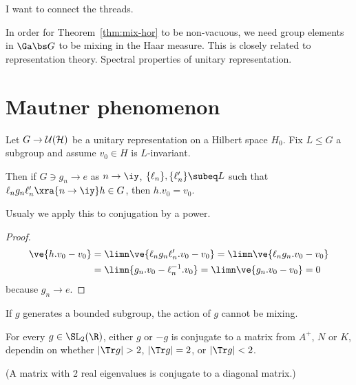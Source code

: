I want to connect the threads. %


In order for Theorem~\ref{thm:mix-hor} to be non-vacuous, we need group elements in $\Ga\bs G$ to be mixing in the Haar measure. This is closely related to representation theory. Spectral properties of unitary representation. 

\section{Mautner phenomenon}

\begin{lem}
Let $G\to \cal U(H)$ be a unitary representation on a Hilbert space $H_0$. Fix $L\le G$ a subgroup and assume $v_0\in H$ is $L$-invariant. 

Then if $G\ni g_n\to e$ as $n\to \iy$, $\{\ell_n\},\{\ell_n'\}\subeq L$ such that $\ell_ng_n\ell_n'\xra{n\to \iy} h\in G$, then $h. v_0=v_0$.
\end{lem}

Usualy we apply this to conjugation by a power.

\begin{proof}
\begin{align}
\ve{h.v_0-v_0}
&= \limn \ve{\ell_n g_n\ell_n' . v_0-v_0}
=\limn \ve{\ell_n g_n.v_0 - v_0}\\
&=
\limn{g_n.v_0-\ell_n^{-1}.v_0} =  \limn \ve{g_n.v_0-v_0}=0
\end{align}
because $g_n\to e$. 
\end{proof}
If $g$ generates a bounded subgroup, the action of $g$ cannot be mixing.

\begin{lem}
For every $g\in \SL_2(\R)$, either $g$ or $-g$ is conjugate to a matrix from $A^+$, $N$ or $K$, dependin on whether $|\Tr g|>2$, $|\Tr g|=2$, or $|\Tr g|<2$.
\end{lem}
(A matrix with 2 real eigenvalues is conjugate to a diagonal matrix.)

